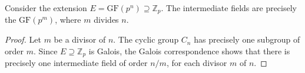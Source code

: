 \begin{corollary}
  \label{co:2}
  Consider the extension $E = \mathrm{GF}(p^n) ⊇ ℤ_p$. The intermediate fields are precisely the $\mathrm{GF}(p^m)$, where $m$ divides $n$. 
\end{corollary}

\begin{proof}
Let $m$ be a divisor of $n$. The cyclic group   $C_n$ has precisely one subgroup of order $m$. Since $E ⊇ℤ_p$  is Galois, the Galois correspondence shows that there is precisely one intermediate field of order $n/m$, for each divisor $m$ of $n$. 
\end{proof}


